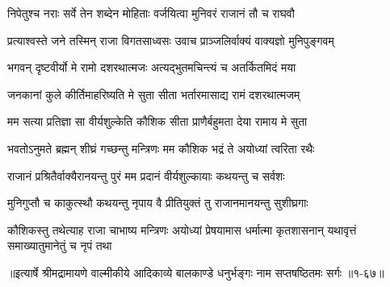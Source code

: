 \twolineshloka
{निपेतुश्च नराः सर्वे तेन शब्देन मोहिताः}
{वर्जयित्वा मुनिवरं राजानं तौ च राघवौ} %

\twolineshloka
{प्रत्याश्वस्ते जने तस्मिन् राजा विगतसाध्वसः}
{उवाच प्राञ्जलिर्वाक्यं वाक्यज्ञो मुनिपुङ्गवम्} %

\twolineshloka
{भगवन् दृष्टवीर्यो मे रामो दशरथात्मजः}
{अत्यद्भुतमचिन्त्यं च अतर्कितमिदं मया} %

\twolineshloka
{जनकानां कुले कीर्तिमाहरिष्यति मे सुता}
{सीता भर्तारमासाद्य रामं दशरथात्मजम्} %

\twolineshloka
{मम सत्या प्रतिज्ञा सा वीर्यशुल्केति कौशिक}
{सीता प्राणैर्बहुमता देया रामाय मे सुता} %

\twolineshloka
{भवतोऽनुमते ब्रह्मन् शीघ्रं गच्छन्तु मन्त्रिणः}
{मम कौशिक भद्रं ते अयोध्यां त्वरिता रथैः} %

\twolineshloka
{राजानं प्रश्रितैर्वाक्यैरानयन्तु पुरं मम}
{प्रदानं वीर्यशुल्कायाः कथयन्तु च सर्वशः} %

\twolineshloka
{मुनिगुप्तौ च काकुत्स्थौ कथयन्तु नृपाय वै}
{प्रीतियुक्तं तु राजानमानयन्तु सुशीघ्रगाः} %

\threelineshloka
{कौशिकस्तु तथेत्याह राजा चाभाष्य मन्त्रिणः}
{अयोध्यां प्रेषयामास धर्मात्मा कृतशासनान्}
{यथावृत्तं समाख्यातुमानेतुं च नृपं तथा} %


॥इत्यार्षे श्रीमद्रामायणे वाल्मीकीये आदिकाव्ये बालकाण्डे धनुर्भङ्गः नाम सप्तषष्ठितमः सर्गः ॥१-६७॥
